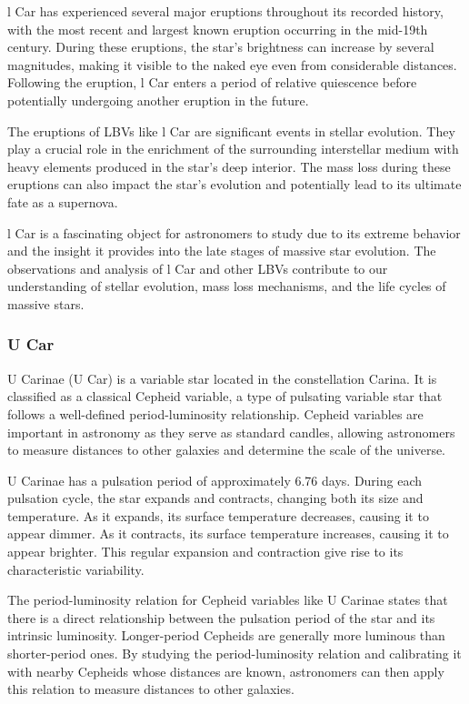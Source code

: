 l Car has experienced several major eruptions throughout its recorded history, with the most recent and largest known eruption occurring in the mid-19th century. During these eruptions, the star's brightness can increase by several magnitudes, making it visible to the naked eye even from considerable distances. Following the eruption, l Car enters a period of relative quiescence before potentially undergoing another eruption in the future.

The eruptions of LBVs like l Car are significant events in stellar evolution. They play a crucial role in the enrichment of the surrounding interstellar medium with heavy elements produced in the star's deep interior. The mass loss during these eruptions can also impact the star's evolution and potentially lead to its ultimate fate as a supernova.

l Car is a fascinating object for astronomers to study due to its extreme behavior and the insight it provides into the late stages of massive star evolution. The observations and analysis of l Car and other LBVs contribute to our understanding of stellar evolution, mass loss mechanisms, and the life cycles of massive stars.

\subsubsection*{ U Car }
U Carinae (U Car) is a variable star located in the constellation Carina. It is classified as a classical Cepheid variable, a type of pulsating variable star that follows a well-defined period-luminosity relationship. Cepheid variables are important in astronomy as they serve as standard candles, allowing astronomers to measure distances to other galaxies and determine the scale of the universe.

U Carinae has a pulsation period of approximately 6.76 days. During each pulsation cycle, the star expands and contracts, changing both its size and temperature. As it expands, its surface temperature decreases, causing it to appear dimmer. As it contracts, its surface temperature increases, causing it to appear brighter. This regular expansion and contraction give rise to its characteristic variability.

The period-luminosity relation for Cepheid variables like U Carinae states that there is a direct relationship between the pulsation period of the star and its intrinsic luminosity. Longer-period Cepheids are generally more luminous than shorter-period ones. By studying the period-luminosity relation and calibrating it with nearby Cepheids whose distances are known, astronomers can then apply this relation to measure distances to other galaxies.

